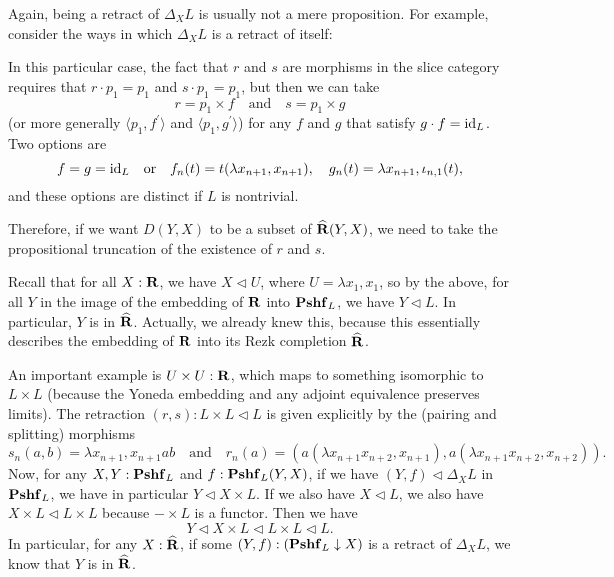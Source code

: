 \begin{remark}
  Again, being a retract of $ \Delta_X L $ is usually not a mere proposition. For example, consider the ways in which $ \Delta_X L $ is a retract of itself:
  \begin{center}
  \end{center}
  In this particular case, the fact that $ r $ and $ s $ are morphisms in the slice category requires that $ r \cdot p_1 = p_1 $ and $ s \cdot p_1 = p_1 $, but then we can take
  \[ r = p_1 \times f \quad \text{and} \quad s = p_1 \times g  \]
  (or more generally $ \langle p_1, f^\prime \rangle $ and $ \langle p_1, g^\prime \rangle $) for any $ f $ and $ g $ that satisfy $ g \cdot f = \text{id}_{L} $. Two options are
  \[ f = g = \text{id}_{L} \quad \text{or} \quad f_n(t) = t (\lambda x_{n + 1}, x_{n + 1}), \quad g_n(t) = \lambda x_{n + 1}, \iota_{n, 1}(t), \]
  and these options are distinct if $ L $ is nontrivial.

  Therefore, if we want $ D(Y, X) $ to be a subset of $ \widehat {\mathbf{R}}(Y, X) $, we need to take the propositional truncation of the existence of $ r $ and $ s $.
\end{remark}

\begin{remark}
  Recall that for all $ X : \mathbf{R} $, we have $ X \triangleleft U $, where $ U = \lambda x_1, x_1 $, so by the above, for all $ Y $ in the image of the embedding of $ \mathbf{R} $ into $ \mathbf{Pshf}_{L} $, we have $ Y \triangleleft L $. In particular, $ Y $ is in $ \widehat {\mathbf{R}} $. Actually, we already knew this, because this essentially describes the embedding of $ \mathbf{R} $ into its Rezk completion $ \widehat {\mathbf{R}} $.

  An important example is $ U \times U : \mathbf{R} $, which maps to something isomorphic to $ L \times L $ (because the Yoneda embedding and any adjoint equivalence preserves limits). The retraction $ (r, s) : L \times L \triangleleft L $ is given explicitly by the (pairing and splitting) morphisms
  \[ s_n(a, b) = \lambda x_{n + 1}, x_{n + 1} a b \quad \text{and} \quad r_n(a) = (a (\lambda x_{n + 1} x_{n + 2}, x_{n + 1}), a (\lambda x_{n + 1} x_{n + 2}, x_{n + 2})). \]
  Now, for any $ X, Y : \mathbf{Pshf}_{L} $ and $ f : \mathbf{Pshf}_{L}(Y, X) $, if we have $ (Y, f) \triangleleft \Delta_X L $ in $ \mathbf{Pshf}_{L} $, we have in particular $ Y \triangleleft X \times L $. If we also have $ X \triangleleft L $, we also have $ X \times L \triangleleft L \times L $ because $ - \times L $ is a functor. Then we have
  \[ Y \triangleleft X \times L \triangleleft L \times L \triangleleft L. \]
  In particular, for any $ X : \widehat {\mathbf{R}} $, if some $ (Y, f) : (\mathbf{Pshf}_{L} \downarrow X) $ is a retract of $ \Delta_X L $, we know that $ Y $ is in $ \widehat {\mathbf{R}} $.
\end{remark}

